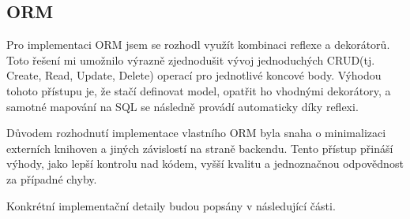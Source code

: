 \subsection{ORM}
Pro implementaci ORM jsem se rozhodl využít kombinaci reflexe a dekorátorů. Toto řešení mi umožnilo výrazně zjednodušit vývoj jednoduchých CRUD(tj. Create, Read, Update, Delete) operací pro jednotlivé koncové body. Výhodou tohoto přístupu je, že stačí definovat model, opatřit ho vhodnými dekorátory, a samotné mapování na SQL se následně provádí automaticky díky reflexi.

Důvodem rozhodnutí implementace vlastního ORM byla snaha o minimalizaci externích knihoven a jiných závislostí na straně backendu. Tento přístup přináší výhody, jako lepší kontrolu nad kódem, vyšší kvalitu a jednoznačnou odpovědnost za případné chyby.

Konkrétní implementační detaily budou popsány v následující části.

